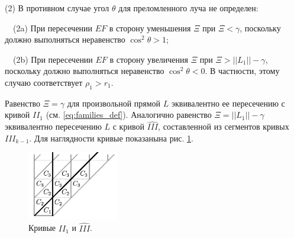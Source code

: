 (2) В противном случае угол $\theta$ для преломленного луча не определен:

$\quad $(2a) При пересечении $EF$ в сторону уменьшения $\Xi$ при $\Xi < \gamma$, поскольку должно выполняться неравенство $\cos^2 \theta > 1$;

$\quad $(2b) При пересечении $EF$ в сторону увеличения $\Xi$ при $\Xi > ||L_1|| - \gamma$, поскольку должно выполняться неравенство $\cos^2 \theta < 0$. В частности, этому случаю соответствует $\rho_1 > r_1$.

Равенство $\Xi = \gamma$ для произвольной прямой $L$ эквивалентно ее пересечению с кривой $II_1$ (см. \ref{eq:families_def}). Аналогично равенство $\Xi = ||L_1||-\gamma$ эквивалентно пересечению $L$ с кривой $\widehat{III}$, составленной из сегментов кривых $III_{k-1}$. 
%
%
Для наглядности кривые показанына рис. \ref{fig:pt10:_B1_lattice_straight_with_line}.
\begin{figure}[!htb]
\centering
\includegraphics[width=4cm]{images/section3_circular/B1_lattice_straight_with_line.pdf}
    \caption{Кривые $II_1$ и $\widehat{III}$.}
    \label{fig:pt10:_B1_lattice_straight_with_line}
\end{figure}


